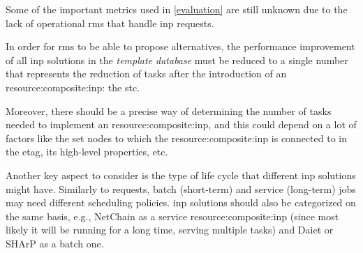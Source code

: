 Some of the important metrics used in \autoref{evaluation} are still unknown due to the lack of operational \glspl{rm} that handle \gls{inp} requests.

In order for \glspl{rm} to be able to propose alternatives, the performance improvement of all \gls{inp} solutions in the \textit{template database} must be reduced to a single number that represents the reduction of  tasks after the introduction of an \gls{resource:composite:inp}: the \gls{stc}.

Moreover, there should be a precise way of determining the number of  tasks needed to implement an \gls{resource:composite:inp}, and this could depend on a lot of factors like the set nodes to which the \gls{resource:composite:inp} is connected to in the \gls{etag}, its high-level properties, etc.

Another key aspect to consider is the type of life cycle that different \gls{inp} solutions might have.
Similarly to  requests, batch (short-term) and service (long-term) jobs may need different scheduling policies.
\gls{inp} solutions should also be categorized on the same basis, e.g., NetChain \cite{netchain} as a service \gls{resource:composite:inp} (since most likely it will be running for a long time, serving multiple  tasks) and Daiet \cite{daiet} or SHArP \cite{sharp} as a batch one.
